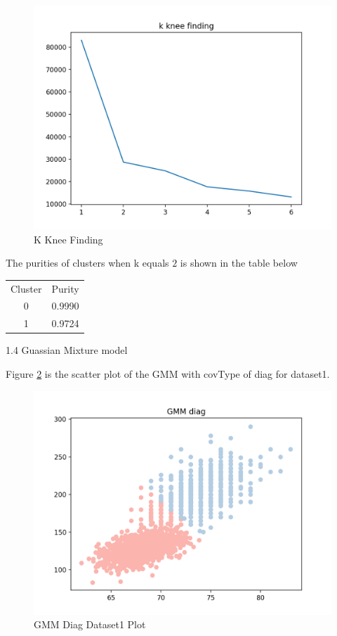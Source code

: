 \documentclass[11pt]{article}
\begin{document}
\begin{enumerate}
\begin{figure}[!h]
  \centering
  \includegraphics[width=\linewidth]{figures/k_knee_finding.png}
  \caption{K Knee Finding}
  \label{fig:k_knee_finding}
\end{figure}

The purities of clusters when k equals $2$ is shown in the table below

\begin{center}
  \begin{tabular}{ |c|c| }
   \hline
   Cluster & Purity \\
   0 & 0.9990 \\
   1 & 0.9724 \\
   \hline
  \end{tabular}
\end{center}

\medskip

1.4 Guassian Mixture model

Figure \ref{fig:gmm_diag_1} is the scatter plot of the GMM with covType of diag for dataset1.

\begin{figure}[!h]
  \centering
  \includegraphics[width=\linewidth]{figures/gmm_diag_1.png}
  \caption{GMM Diag Dataset1 Plot}
  \label{fig:gmm_diag_1}
\end{figure}


\end{enumerate}
\end{document}
